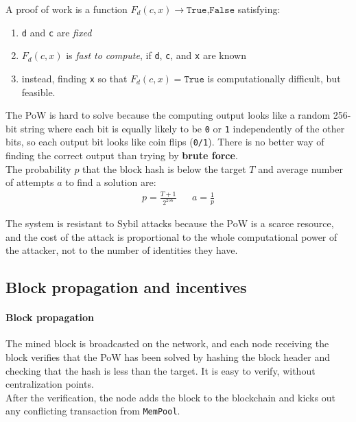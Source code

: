 \begin{definition}
   A proof of work is a function $F_d(c,x) \rightarrow {\texttt{True,False}}$ satisfying:
   \begin{enumerate}
      \item \texttt{d} and \texttt{c} are \textit{fixed}
      \item $F_d(c,x)$ is \textit{fast to compute}, if \texttt{d}, \texttt{c}, and \texttt{x} are known
      \item instead, finding \texttt{x} so that $F_d(c,x) = \texttt{True}$ is computationally difficult, but feasible.
   \end{enumerate}
\end{definition}

The PoW is hard to solve because the computing output looks like a random 256-bit string where each bit is equally likely to be \texttt{0} or \texttt{1} independently of the other bits, so each output bit looks like coin flips (\texttt{0/1}).
There is no better way of finding the correct output than trying by \textbf{brute force}.\\
The probability $p$ that the block hash is below the target $T$ and average number of attempts $a$ to find a solution are:
\begin{align*}
   p=\frac{T+1}{2^{256}} & & a=\frac{1}{p}
\end{align*}

The system is resistant to Sybil attacks because the PoW is a scarce resource, and the cost of the attack is proportional to the whole computational power of the attacker, not to the number of identities they have.


\subsection{Block propagation and incentives}
\paragraph{Block propagation}
The mined block is broadcasted on the network, and each node receiving the block verifies that the PoW has been solved by hashing the block header and checking that the hash is less than the target.
It is easy to verify, without centralization points.\\
After the verification, the node adds the block to the blockchain and kicks out any conflicting transaction from \texttt{MemPool}.

